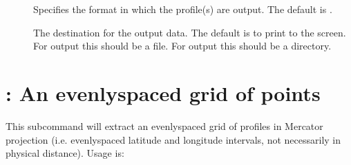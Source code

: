\documentclass[letterpaper,10pt,english]{sphinxmanual}
\begin{document}
\sphinxAtStartPar
{}
\begin{description}
\item[{}] \leavevmode
\sphinxAtStartPar
Specifies the format in which the profile(s) are output.  The default is .

\item[{}] \leavevmode
\sphinxAtStartPar
The destination for the output data.  The default is to print to the screen.  For  output this should be a file.  For  output this should be a directory.

\item[{}] \leavevmode
\sphinxAtStartPar
{}

\sphinxAtStartPar
{}

\end{description}


\section{: An evenly\sphinxhyphen{}spaced grid of points}
\label{\detokenize{userguide:grid-an-evenly-spaced-grid-of-points}}
\sphinxAtStartPar
This subcommand will extract an evenly\sphinxhyphen{}spaced grid of profiles in Mercator projection (i.e. evenly\sphinxhyphen{}spaced latitude and longitude intervals, not necessarily in physical distance).  Usage is:
\end{document}
